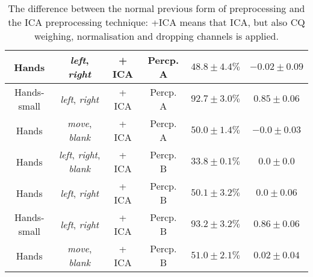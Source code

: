 \begin{table}[h]
{\begin{tabular}{c|c|c|c|c|c}
    Hands               & \textit{left}, \textit{right}                 & + ICA                     & Percp. A              &   $48.8 \pm 4.4 \%$   & $-0.02 \pm 0.09$\\    \hline
    Hands-small         & \textit{left}, \textit{right}                 & + ICA                     & Percp. A              &   $92.7 \pm 3.0 \%$   & $0.85 \pm 0.06$\\     \hline
    Hands               & \textit{move}, \textit{blank}                 & + ICA                     & Percp. A              &  $50.0 \pm 1.4 \%$    & $-0.0 \pm 0.03$\\     \hline
    Hands               & \textit{left}, \textit{right}, \textit{blank} & + ICA                     & Percp. B              &  $33.8 \pm 0.1 \%$    & $0.0 \pm 0.0$\\       \hline
    Hands               & \textit{left}, \textit{right}                 & + ICA                     & Percp. B              &  $50.1 \pm 3.2 \%$    & $0.0 \pm 0.06$\\      \hline
    Hands-small         & \textit{left}, \textit{right}                 & + ICA                     & Percp. B              &  $93.2 \pm 3.2 \%$    & $0.86 \pm 0.06$\\     \hline
    Hands               & \textit{move}, \textit{blank}                 & + ICA                     & Percp. B              & $51.0 \pm 2.1 \%$     &  $0.02 \pm 0.04$\\    \hline
\end{tabular}
}
\caption{The difference between the normal previous form of preprocessing and the ICA preprocessing technique: \textsc{+ICA} means that ICA, but also CQ weighing, normalisation and dropping channels is applied.}\label{tab:hands-ica-app}
\end{table}
